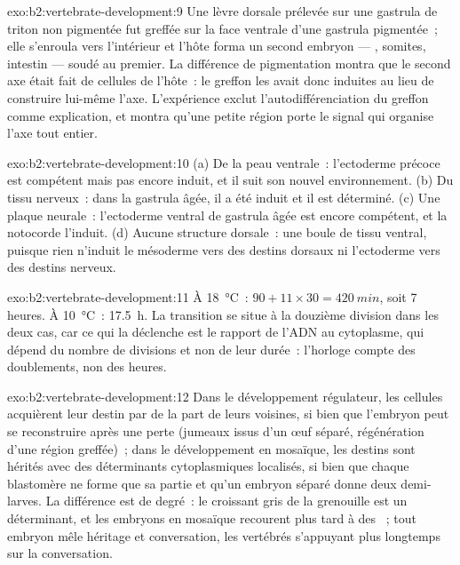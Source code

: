 \begin{solution}{exo:b2:vertebrate-development:9}
Une lèvre dorsale prélevée sur une gastrula de triton non pigmentée fut
greffée sur la face ventrale d'une gastrula pigmentée~; elle s'enroula
vers l'intérieur et l'hôte forma un second embryon --- ,
somites, intestin --- soudé au premier. La différence de pigmentation
montra que le second axe était fait de cellules de l'hôte~: le greffon
les avait donc induites au lieu de construire lui-même l'axe.
L'expérience exclut l'autodifférenciation du greffon comme explication,
et montra qu'une petite région porte le signal qui organise l'axe tout
entier.
\end{solution}

\begin{solution}{exo:b2:vertebrate-development:10}
(a) De la peau ventrale~: l'ectoderme précoce est compétent mais pas
encore induit, et il suit son nouvel environnement. (b) Du tissu
nerveux~: dans la gastrula âgée, il a été induit et il est déterminé.
(c) Une plaque neurale~: l'ectoderme ventral de gastrula âgée est encore
compétent, et la notocorde l'induit. (d) Aucune structure dorsale~: une
boule de tissu ventral, puisque rien n'induit le mésoderme vers des
destins dorsaux ni l'ectoderme vers des destins nerveux.
\end{solution}

\begin{solution}{exo:b2:vertebrate-development:11}
À \qty{18}{\celsius}~: $90 + 11\times 30 = \qty{420}{min}$, soit
7 heures. À \qty{10}{\celsius}~: \qty{17.5}{h}. La transition se situe à
la douzième division dans les deux cas, car ce qui la déclenche est le
rapport de l'ADN au cytoplasme, qui dépend du nombre de divisions et non
de leur durée~: l'horloge compte des doublements, non des heures.
\end{solution}

\begin{solution}{exo:b2:vertebrate-development:12}
Dans le développement régulateur, les cellules acquièrent leur destin
par  de la part de leurs voisines, si bien que l'embryon peut
se reconstruire après une perte (jumeaux issus d'un œuf séparé,
régénération d'une région greffée)~; dans le développement en mosaïque,
les destins sont hérités avec des déterminants cytoplasmiques localisés,
si bien que chaque blastomère ne forme que sa partie et qu'un embryon
séparé donne deux demi-larves. La différence est de degré~: le croissant
gris de la grenouille est un déterminant, et les embryons en mosaïque
recourent plus tard à des ~; tout embryon mêle héritage et
conversation, les vertébrés s'appuyant plus longtemps sur la
conversation.
\end{solution}

